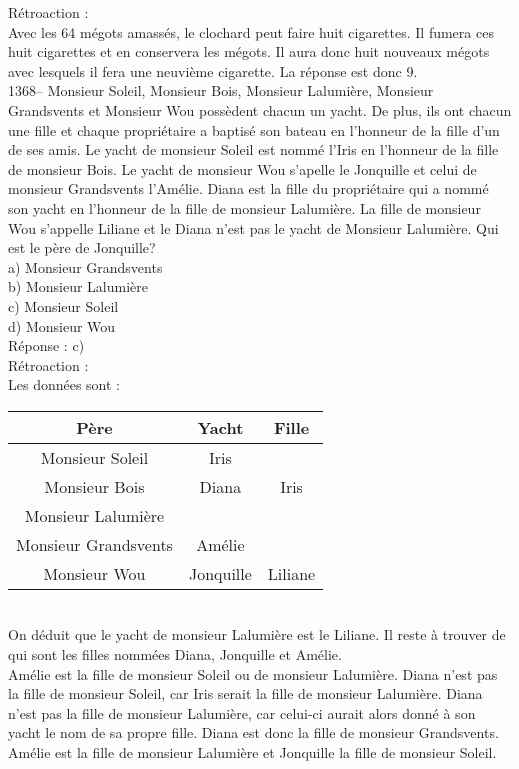 ﻿\documentclass[letterpaper, 12pt]{article}
\begin{document}
R\'etroaction : \\
Avec les 64 m\'egots amass\'es, le clochard peut faire huit cigarettes.  Il
fumera ces huit cigarettes et en conservera les m\'egots.  Il aura donc huit
nouveaux m\'egots avec lesquels il fera une neuvi\`eme cigarette.  La
r\'eponse est donc 9.\\

1368-- Monsieur Soleil, Monsieur Bois, Monsieur Lalumi\`ere, Monsieur
Grandsvents et Monsieur Wou poss\`edent chacun un yacht.  De plus, ils ont
chacun une fille et chaque propri\'etaire a baptis\'e son bateau en
l'honneur de la fille d'un de ses amis.  Le yacht de monsieur Soleil est
nomm\'e l'Iris en l'honneur de la fille de monsieur Bois.  Le yacht de
monsieur Wou s'apelle le Jonquille et celui de monsieur Grandsvents
l'Am\'elie.  Diana est la fille du propri\'etaire qui a nomm\'e son yacht en
l'honneur de la fille de monsieur Lalumi\`ere.  La fille de monsieur Wou
s'appelle Liliane et le Diana n'est pas le yacht de Monsieur Lalumi\`ere.
Qui est le p\`ere de Jonquille?\\
a) Monsieur Grandsvents\\
b) Monsieur Lalumi\`ere\\
c) Monsieur Soleil\\
d) Monsieur Wou\\

R\'eponse : c)\\

R\'etroaction : \\
Les donn\'ees sont : \\
\begin{tabular}{|c|c|c|} \hline
{\bf P\`ere} & {\bf Yacht} & {\bf Fille}  \\ \hline \hline

Monsieur Soleil        & Iris      &  \\ \hline Monsieur Bois &
Diana     &  Iris\\ \hline Monsieur Lalumi\`ere   &           &
\\ \hline Monsieur Grandsvents   & Am\'elie  &  \\ \hline Monsieur
Wou           & Jonquille &  Liliane\\ \hline

\end{tabular}\\

On d\'eduit que le yacht de monsieur Lalumi\`ere est le Liliane.  Il reste
\`a trouver de qui sont les filles nomm\'ees Diana, Jonquille et Am\'elie.
\\
Am\'elie est la fille de monsieur Soleil ou de monsieur Lalumi\`ere.  Diana
n'est pas la fille de monsieur Soleil, car Iris serait la fille de monsieur
Lalumi\`ere.  Diana n'est pas la fille de monsieur Lalumi\`ere, car celui-ci
aurait alors donn\'e \`a son yacht le nom de sa propre fille.  Diana est
donc la fille de monsieur Grandsvents.  Am\'elie est la fille de monsieur
Lalumi\`ere et Jonquille la fille de monsieur Soleil.  \\
\end{document}
